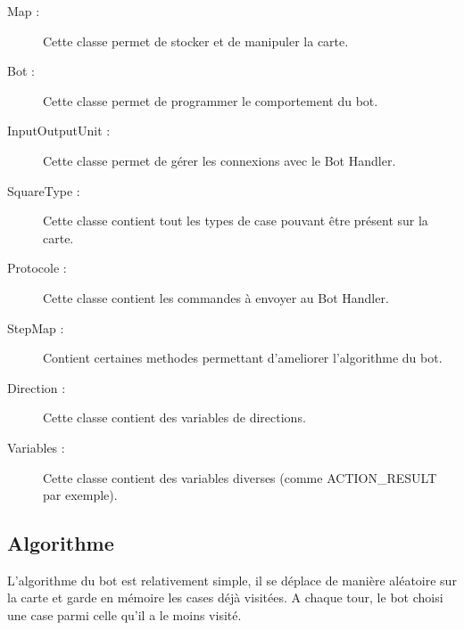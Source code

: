 \begin{description}
\item[Map :] Cette classe permet de stocker et de manipuler la carte.
\item[Bot :] Cette classe permet de programmer le comportement du bot.
\item[InputOutputUnit :] Cette classe permet de gérer les connexions avec le Bot Handler.
\item[SquareType :] Cette classe contient tout les types de case pouvant être présent sur la carte.
\item[Protocole :] Cette classe contient les commandes à envoyer au Bot Handler.
\item[StepMap :] Contient certaines methodes permettant d'ameliorer l'algorithme du bot.
\item[Direction :] Cette classe contient des variables de directions.
\item[Variables :] Cette classe contient des variables diverses (comme ACTION\_RESULT par exemple).
\end{description} 

\subsection{Algorithme}

L'algorithme du bot est relativement simple, il se déplace de manière aléatoire sur la carte et garde en mémoire les cases déjà visitées. A chaque tour, le bot choisi une case parmi celle qu'il a le moins visité. 

\subsection{}
